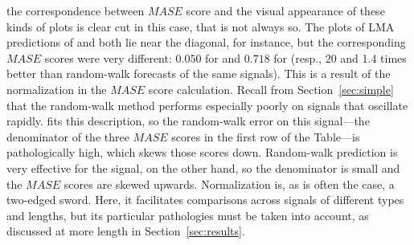the correspondence between $MASE$ score and the visual appearance of
these kinds of plots is clear cut in this case, that is not always so.
The plots of LMA predictions of \col and \svdfive both lie near the
diagonal, for instance, but the corresponding $MASE$ scores were very
different: $0.050$ for \col and $0.718$ for \svdfive (resp., 20 and
1.4 times better than random-walk forecasts of the same signals).
This is a result of the normalization in the $MASE$ score calculation.
Recall from Section~\ref{sec:simple} that the random-walk method
performs especially poorly on signals that oscillate rapidly.  \col
fits this description, so the random-walk error on this signal---the
denominator of the three $MASE$ scores in the first row of the
Table---is pathologically high, which skews those scores down.
Random-walk prediction is very effective for the \svdfive signal, on
the other hand, so the denominator is small and the $MASE$ scores are
skewed upwards.  Normalization is, as is often the case, a two-edged
sword.  Here, it facilitates comparisons across signals of different
types and lengths, but its particular pathologies must be taken into
account, as discussed at more length in Section~\ref{sec:results}.




